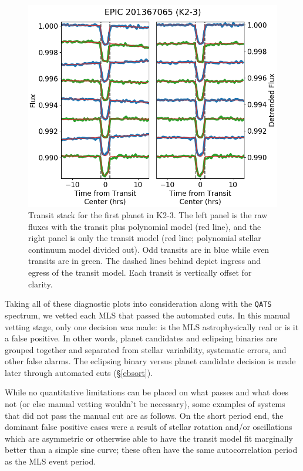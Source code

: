 \documentclass[twocolumn]{aastex62}
\newcommand{\pipeline}[1]{\texttt{#1}}
\begin{document}
\begin{figure}[tbp]
\includegraphics[width=\columnwidth]{stack.png}
\caption{Transit stack for the first planet in K2-3. The left panel is
  the raw fluxes with the transit plus polynomial model (red line),
  and the right panel is only the transit model (red line; polynomial
  stellar continuum model divided out). Odd transits are in blue while
  even transits are in green.  The dashed lines behind depict ingress
  and egress of the transit model. Each transit is vertically offset
  for clarity. \label{stack}}
\end{figure}

Taking all of these diagnostic plots into consideration along with the
\pipeline{QATS} spectrum, we vetted each MLS that passed the automated
cuts. In this manual vetting stage, only one decision was made: is the
MLS astrophysically real or is it a false positive. In other words,
planet candidates and eclipsing binaries are grouped together and
separated from stellar variability, systematic errors, and other false
alarms. The eclipsing binary versus planet candidate decision is made
later through automated cuts (\S\ref{ebsort}).

While no quantitative limitations can be placed on what passes and
what does not (or else manual vetting wouldn't be necessary), some
examples of systems that did not pass the manual cut are as follows.
On the short period end, the dominant false positive cases were a
result of stellar rotation and/or oscillations which are asymmetric or
otherwise able to have the transit model fit marginally better than a
simple sine curve; these often have the same autocorrelation period as
the MLS event period.
\end{document}
